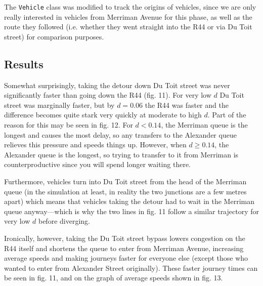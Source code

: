 \documentclass{article}
\begin{document}
The \texttt{Vehicle} class was modified to track the origins of vehicles, since we are only really interested in vehicles from Merriman Avenue for this phase, as well as the route they followed (i.e. whether they went straight into the R44 or via Du Toit street) for comparison purposes.

\subsection*{Results}

Somewhat surprisingly, taking the detour down Du Toit street was never significantly faster than going down the R44 (fig. 11). For very low $d$ Du Toit street was marginally faster, but by $d = 0.06$ the R44 was faster and the difference becomes quite stark very quickly at moderate to high $d$. Part of the reason for this may be seen in fig. 12. For $d < 0.14$, the Merriman queue is the longest and causes the most delay, so any transfers to the Alexander queue relieves this pressure and speeds things up. However, when $d \geq 0.14$, the Alexander queue is the longest, so trying to transfer to it from Merriman is counterproductive since you will spend longer waiting there.

Furthermore, vehicles turn into Du Toit street from the head of the Merriman queue (in the simulation at least, in reality the two junctions are a few metres apart) which means that vehicles taking the detour had to wait in the Merriman queue anyway---which is why the two lines in fig. 11 follow a similar trajectory for very low $d$ before diverging.

Ironically, however, taking the Du Toit street bypass lowers congestion on the R44 itself and shortens the queue to enter from Merriman Avenue, increasing average speeds and making journeys faster for everyone else (except those who wanted to enter from Alexander Street originally). These faster journey times can be seen in fig. 11, and on the graph of average speeds shown in fig. 13.
\end{document}
